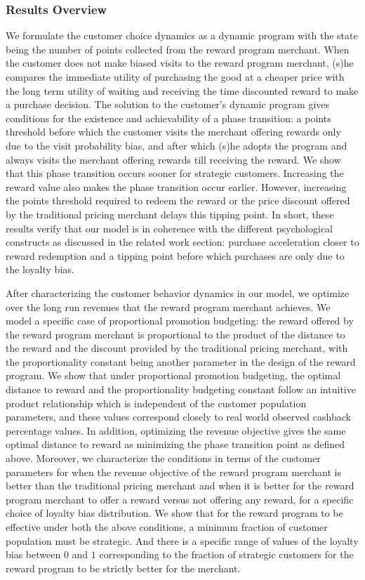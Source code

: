 \subsubsection{Results Overview}
We formulate the customer choice dynamics as a dynamic program with the state being the number of points collected from the reward program merchant.
When the customer does not make biased visits to the reward program merchant, (s)he compares the immediate utility of purchasing the good at a cheaper price with the long term utility of waiting and receiving the time discounted reward to make a purchase decision. 
The solution to the customer's dynamic program gives conditions for the existence and achievability of a phase transition: a points threshold before which the customer visits the merchant offering rewards only due to the visit probability bias, and after which (s)he adopts the program and always visits the merchant offering rewards till receiving the reward.
We show that this phase transition occurs sooner for strategic customers. Increasing the reward value also makes the phase transition occur earlier.
However, increasing the points threshold required to redeem the reward or the price discount offered by the traditional pricing merchant delays this tipping point.
In short, these results verify that our model is in coherence with the different psychological constructs as discussed in the related work section: purchase acceleration closer to reward redemption and a tipping point before which purchases are only due to the loyalty bias.

After characterizing the customer behavior dynamics in our model, we optimize over the long run revenues that the reward program merchant achieves.
We model a specific case of proportional promotion budgeting: the reward offered by the reward program merchant is proportional to the product of the distance to the reward and the discount provided by the traditional pricing merchant, with the proportionality constant being another parameter in the design of the reward program.
We show that under proportional promotion budgeting, the optimal distance to reward and the proportionality budgeting constant follow an intuitive product relationship which is independent of the customer population parameters,
and these values correspond closely to real world observed cashback percentage values.
In addition, optimizing the revenue objective gives the same optimal distance to reward as minimizing the phase transition point as defined above.
Moreover, we characterize the conditions in terms of the customer parameters for when the revenue objective of the reward program merchant is better than the traditional pricing merchant and when it is better for the reward program merchant to offer a reward versus not offering any reward, for a specific choice of loyalty bias distribution.
We show that for the reward program to be effective under both the above conditions, a minimum fraction of customer population must be strategic.
And there is a specific range of values of the loyalty bias between $0$ and $1$ corresponding to the fraction of strategic customers for the reward program to be strictly better for the merchant. 
